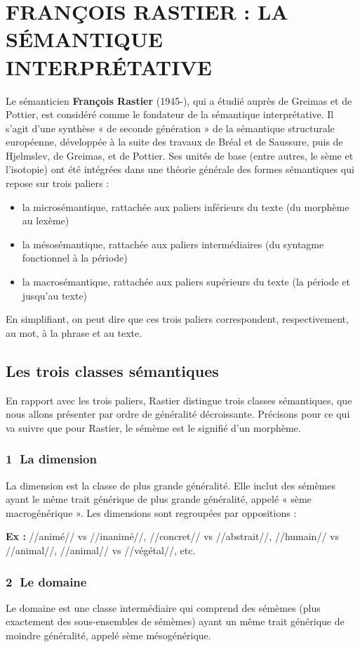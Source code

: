 \section{FRANÇOIS RASTIER : LA SÉMANTIQUE INTERPRÉTATIVE}
Le sémanticien \textbf{François Rastier} (1945-), qui a étudié auprès de Greimas et de Pottier, est considéré comme le fondateur de la sémantique interprétative. Il s’agit d’une synthèse « de seconde génération » de la sémantique structurale européenne, développée à la suite des travaux de Bréal et de Saussure, puis de Hjelmslev, de Greimas, et de Pottier. Ses unités de base (entre autres, le sème et l’isotopie) ont été intégrées dans une théorie générale des formes sémantiques qui repose sur trois paliers :
\begin{itemize}
\item la microsémantique, rattachée aux paliers inférieurs du texte (du morphème au lexème)
\item la mésosémantique, rattachée aux paliers intermédiaires (du syntagme fonctionnel à la période)
\item la macrosémantique, rattachée aux paliers supérieurs du texte (la période et jusqu’au texte)
\end{itemize}
En simplifiant, on peut dire que ces trois paliers correspondent, respectivement, au mot, à la phrase et au texte.

\subsection{Les trois classes sémantiques}
En rapport avec les trois paliers, Rastier distingue trois classes sémantiques, que nous allons présenter par ordre de généralité décroissante. Précisons pour ce qui va suivre que pour Rastier, le sémème est le signifié d’un morphème.

\subsubsection*{\textcircled{\scriptsize 1} La dimension}
La dimension est la classe de plus grande généralité. Elle inclut des sémèmes ayant le même trait générique de plus grande généralité, appelé « sème macrogénérique ». Les dimensions sont regroupées par oppositions :

\noindent\textbf{Ex :} //animé// vs //inanimé//, //concret// vs //abstrait//, //humain// vs //animal//, //animal// vs //végétal//, etc.

\subsubsection*{\textcircled{\scriptsize 2} Le domaine}
Le domaine est une classe intermédiaire qui comprend des sémèmes (plus exactement des sous-ensembles de sémèmes) ayant un même trait générique de moindre généralité, appelé sème mésogénérique.

